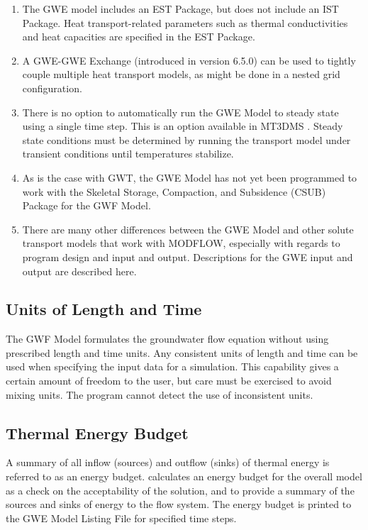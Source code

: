 \begin{enumerate}
\item The GWE model includes an EST Package, but does not include an IST Package.  Heat transport-related parameters such as thermal conductivities and heat capacities are specified in the EST Package.

\item A GWE-GWE Exchange (introduced in version 6.5.0) can be used to tightly couple multiple heat transport models, as might be done in a nested grid configuration.  

\item There is no option to automatically run the GWE Model to steady state using a single time step.  This is an option available in MT3DMS \citep{zheng2010supplemental}.  Steady state conditions must be determined by running the transport model under transient conditions until temperatures stabilize.

\item As is the case with GWT, the GWE Model has not yet been programmed to work with the Skeletal Storage, Compaction, and Subsidence (CSUB) Package for the GWF Model.  

\item There are many other differences between the \mf GWE Model and other solute transport models that work with MODFLOW, especially with regards to program design and input and output.  Descriptions for the GWE input and output are described here.

\end{enumerate}

\subsection{Units of Length and Time}
The GWF Model formulates the groundwater flow equation without using prescribed length and time units. Any consistent units of length and time can be used when specifying the input data for a simulation. This capability gives a certain amount of freedom to the user, but care must be exercised to avoid mixing units.  The program cannot detect the use of inconsistent units.

\subsection{Thermal Energy Budget}
A summary of all inflow (sources) and outflow (sinks) of thermal energy is referred to as an energy budget.  \mf calculates an energy budget for the overall model as a check on the acceptability of the solution, and to provide a summary of the sources and sinks of energy to the flow system.  The energy budget is printed to the GWE Model Listing File for specified time steps.

